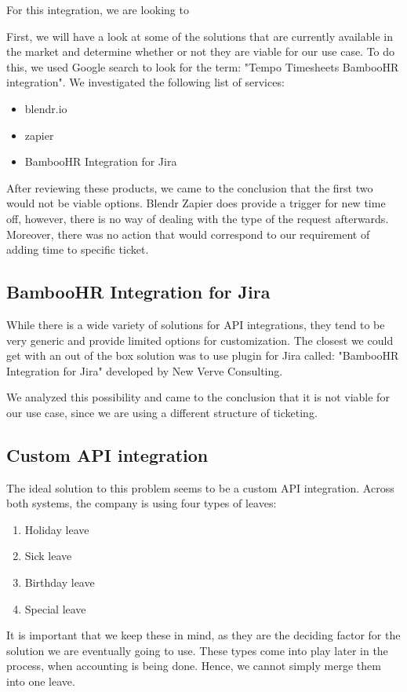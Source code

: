 \documentclass[12pt,oneside]{fithesis2}
\begin{document}
For this integration, we are looking to 

First, we will have a look at some of the solutions that are currently available in the market and determine whether or not they are viable for our use case. To do this, we used Google search to look for the term: "Tempo Timesheets BambooHR integration". We investigated the following list of services:
\begin{itemize}
    \setlength\itemsep{0em}
    \item blendr.io 
    \item zapier
    \item BambooHR Integration for Jira
\end{itemize}
After reviewing these products, we came to the conclusion that the first two would not be viable options. Blendr \cite{blendr} Zapier does provide a trigger for new time off, however, there is no way of dealing with the type of the request afterwards. Moreover, there was no action that would correspond to our requirement of adding time to specific ticket.\cite{zapier}

\subsection*{BambooHR Integration for Jira}
While there is a wide variety of solutions for API integrations, they tend to be very generic and provide limited options for customization. The closest we could get with an out of the box solution was to use plugin for Jira called: "BambooHR Integration for Jira" developed by New Verve Consulting.

We analyzed this possibility and came to the conclusion that it is not viable for our use case, since we are using a different structure of ticketing.

\subsection*{Custom API integration}
The ideal solution to this problem seems to be a custom API integration. 
\newline\newline
Across both systems, the company is using four types of leaves:
\begin{enumerate}
    \setlength\itemsep{0em}
    \item Holiday leave
    \item Sick leave
    \item Birthday leave
    \item Special leave
\end{enumerate}
It is important that we keep these in mind, as they are the deciding factor for the solution we are eventually going to use. These types come into play later in the process, when accounting is being done. Hence, we cannot simply merge them into one leave.
\end{document}
